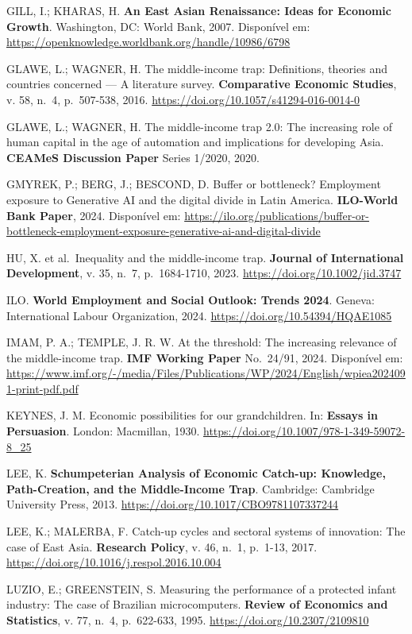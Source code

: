 \documentclass[
  brazilian,
  12pt,
]{article}
\begin{document}
GILL, I.; KHARAS, H. \textbf{An East Asian Renaissance: Ideas for Economic Growth}. Washington, DC: World Bank, 2007. Disponível em: \url{https://openknowledge.worldbank.org/handle/10986/6798}

GLAWE, L.; WAGNER, H. The middle-income trap: Definitions, theories and countries concerned --- A literature survey. \textbf{Comparative Economic Studies}, v. 58, n.~4, p.~507-538, 2016. \url{https://doi.org/10.1057/s41294-016-0014-0}

GLAWE, L.; WAGNER, H. The middle-income trap 2.0: The increasing role of human capital in the age of automation and implications for developing Asia. \textbf{CEAMeS Discussion Paper} Series 1/2020, 2020.

GMYREK, P.; BERG, J.; BESCOND, D. Buffer or bottleneck? Employment exposure to Generative AI and the digital divide in Latin America. \textbf{ILO-World Bank Paper}, 2024. Disponível em: \url{https://ilo.org/publications/buffer-or-bottleneck-employment-exposure-generative-ai-and-digital-divide}

HU, X. et al.~Inequality and the middle-income trap. \textbf{Journal of International Development}, v. 35, n.~7, p.~1684-1710, 2023. \url{https://doi.org/10.1002/jid.3747}

ILO. \textbf{World Employment and Social Outlook: Trends 2024}. Geneva: International Labour Organization, 2024. \url{https://doi.org/10.54394/HQAE1085}

IMAM, P. A.; TEMPLE, J. R. W. At the threshold: The increasing relevance of the middle-income trap. \textbf{IMF Working Paper} No.~24/91, 2024. Disponível em: \url{https://www.imf.org/-/media/Files/Publications/WP/2024/English/wpiea2024091-print-pdf.pdf}

KEYNES, J. M. Economic possibilities for our grandchildren. In: \textbf{Essays in Persuasion}. London: Macmillan, 1930. \url{https://doi.org/10.1007/978-1-349-59072-8_25}

LEE, K. \textbf{Schumpeterian Analysis of Economic Catch-up: Knowledge, Path-Creation, and the Middle-Income Trap}. Cambridge: Cambridge University Press, 2013. \url{https://doi.org/10.1017/CBO9781107337244}

LEE, K.; MALERBA, F. Catch-up cycles and sectoral systems of innovation: The case of East Asia. \textbf{Research Policy}, v. 46, n.~1, p.~1-13, 2017. \url{https://doi.org/10.1016/j.respol.2016.10.004}

LUZIO, E.; GREENSTEIN, S. Measuring the performance of a protected infant industry: The case of Brazilian microcomputers. \textbf{Review of Economics and Statistics}, v. 77, n.~4, p.~622-633, 1995. \url{https://doi.org/10.2307/2109810}
\end{document}

